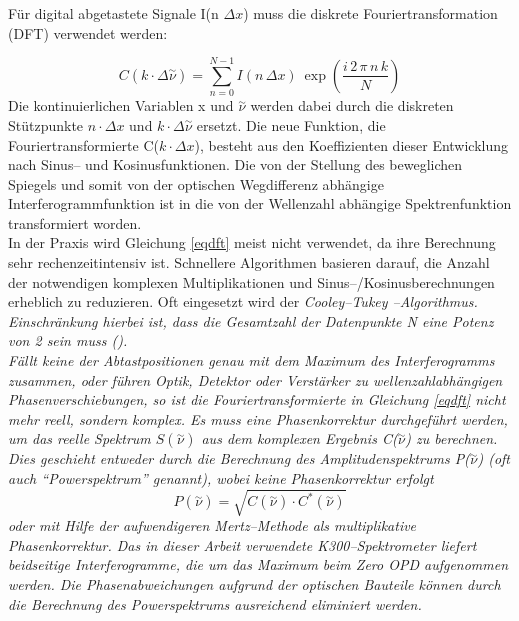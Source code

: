 Für digital abgetastete Signale I(n $\Delta x$) muss die diskrete
Fouriertransformation (DFT) verwendet werden:

\begin{equation}\label{eqdft}
  C (k \cdot
  \Delta\!\stackrel{\sim}{\nu})=\sum_{n=0}^{N-1}I(n\,\Delta x)\:
  \exp (\frac{i\, 2\,\pi\, n\, k}{N})
\end{equation}
Die kontinuierlichen Variablen x und $\stackrel{\sim}{\nu}$ werden
dabei durch die diskreten Stützpunkte $n\cdot \Delta x$ und $k
\cdot \Delta\!\stackrel{\sim}{\nu}$ ersetzt. Die neue Funktion,
die Fouriertransformierte C($k \cdot \Delta x$), besteht aus den
Koeffizienten dieser Entwicklung nach Sinus-- und
Kosinusfunktionen. Die von der Stellung des beweglichen Spiegels
und somit von der optischen Wegdifferenz abhängige
Interferogrammfunktion ist in die von der Wellenzahl abhängige
Spektrenfunktion transformiert worden.\\

In der Praxis wird Gleichung \ref{eqdft} meist nicht verwendet, da
ihre Berechnung sehr rechenzeitintensiv ist. Schnellere
Algorithmen basieren darauf, die Anzahl der notwendigen komplexen
Multiplikationen und Sinus--/Kosinusberechnungen erheblich zu
reduzieren. Oft eingesetzt wird der \it Cooley--Tukey\rm
--Algorithmus. Einschränkung hierbei ist, dass die Gesamtzahl der
Datenpunkte N eine Potenz von 2 sein muss (\cite{higham96}).\\


Fällt keine der Abtastpositionen genau mit dem Maximum des
Interferogramms zusammen, oder führen Optik, Detektor oder
Verstärker zu wellenzahlabhängigen Phasenverschiebungen, so ist
die Fouriertransformierte in Gleichung \ref{eqdft} nicht mehr
reell, sondern komplex. Es muss eine Phasenkorrektur durchgeführt
werden, um das reelle Spektrum $S(\stackrel{\sim}{\nu})$ aus dem
komplexen Ergebnis C($\stackrel{\sim}{\nu}$) zu berechnen. Dies
geschieht entweder durch die Berechnung des \it
Amplitudenspektrums \rm P($\stackrel{\sim}{\nu}$) (oft auch
"`Powerspektrum"' genannt), wobei keine Phasenkorrektur erfolgt
\begin{equation}\label{eqpow}
  P(\stackrel{\sim}{\nu})=\sqrt{C(\stackrel{\sim}{\nu}) \cdot
  C^*(\stackrel{\sim}{\nu})}
\end{equation}
oder mit Hilfe der aufwendigeren Mertz--Methode \cite{mertz67} als
multiplikative Phasenkorrektur. Das in dieser Arbeit verwendete
K300--Spektrometer liefert beidseitige Interferogramme, die um das
Maximum beim Zero OPD aufgenommen werden. Die Phasenabweichungen
aufgrund der optischen Bauteile können durch die Berechnung des
Powerspektrums ausreichend eliminiert werden.\\

